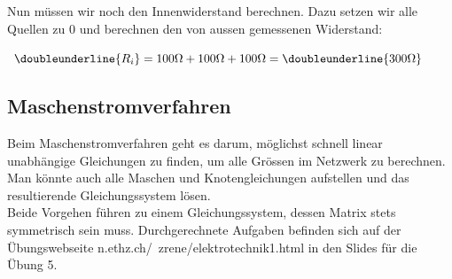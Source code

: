 					Nun müssen wir noch den Innenwiderstand berechnen. Dazu setzen wir alle Quellen zu 0 und berechnen den von aussen gemessenen Widerstand:\\
					\begin{center}
						\fix
					\end{center}
										$\doubleunderline{R_i} = 100\Omega + 100\Omega  + 100\Omega  = \doubleunderline{300 \Omega} $
					\iend


					\subsection{Maschenstromverfahren}
					Beim Maschenstromverfahren geht es darum, möglichst schnell linear unabhängige Gleichungen zu finden, um alle Grössen im Netzwerk zu berechnen. \\
					Man könnte auch alle Maschen und Knotengleichungen aufstellen und das resultierende Gleichungssystem lösen. \\
					Beide Vorgehen führen zu einem Gleichungssystem, dessen Matrix stets symmetrisch sein muss.
					Durchgerechnete Aufgaben befinden sich auf der Übungswebseite n.ethz.ch/~zrene/elektrotechnik1.html in den Slides für die Übung 5. \\
\newpage

